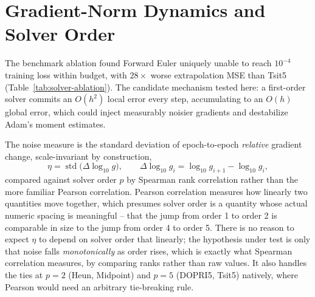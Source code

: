 \section{Gradient-Norm Dynamics and Solver Order}
\label{sec:track-b}

The benchmark ablation found Forward Euler uniquely unable to reach $10^{-4}$
training loss within budget, with $28\times$ worse extrapolation MSE than
Tsit5 (Table~\ref{tab:solver-ablation}). The candidate mechanism tested here: a
first-order solver commits an $O(h^2)$ local error every step, accumulating to
an $O(h)$ global error, which could
inject measurably noisier gradients and destabilize Adam's moment estimates.

\begin{expectbox}
\end{expectbox}

The noise measure is the standard deviation of epoch-to-epoch \emph{relative}
gradient change, scale-invariant by construction,
\begin{equation}
\eta = \operatorname{std}\big(\Delta\log_{10} g\big), \qquad
\Delta\log_{10} g_i = \log_{10} g_{i+1} - \log_{10} g_i,
\label{eq:noise-measure}
\end{equation}
compared against solver order $p$ by Spearman rank correlation rather than
the more familiar Pearson correlation. Pearson correlation measures how
linearly two quantities move together, which presumes solver order is a
quantity whose actual numeric spacing is meaningful -- that the jump from
order 1 to order 2 is comparable in size to the jump from order 4 to order
5. There is no reason to expect $\eta$ to depend on solver order that
linearly; the hypothesis under test is only that noise falls
\emph{monotonically} as order rises, which is exactly what Spearman
correlation measures, by comparing ranks rather than raw values. It also
handles the ties at $p=2$ (Heun, Midpoint) and $p=5$ (DOPRI5, Tsit5)
natively, where Pearson would need an arbitrary tie-breaking rule.

